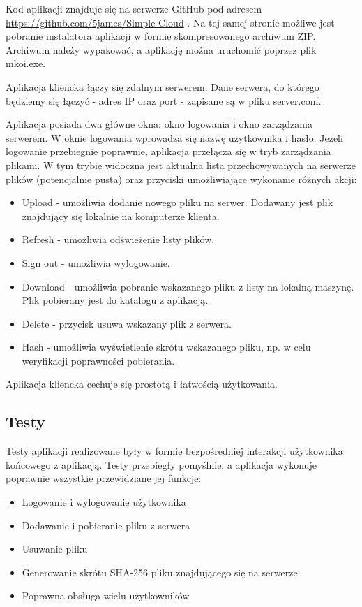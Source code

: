\documentclass{article}
\begin{document}
	Kod aplikacji znajduje się na serwerze GitHub pod adresem \url{https://github.com/5james/Simple-Cloud} . Na tej samej stronie możliwe jest pobranie instalatora aplikacji w formie skompresowanego archiwum ZIP. Archiwum należy wypakować, a aplikację można uruchomić poprzez plik mkoi.exe. 
	
	Aplikacja kliencka łączy się zdalnym serwerem. Dane serwera, do którego będziemy się łączyć - adres IP oraz port - zapisane są w pliku server.conf. 
	
	Aplikacja posiada dwa główne okna: okno logowania i okno zarządzania serwerem. W oknie logowania wprowadza się nazwę użytkownika i hasło. Jeżeli logowanie przebiegnie poprawnie, aplikacja przełącza się w tryb zarządzania plikami. W tym trybie widoczna jest aktualna lista przechowywanych na serwerze plików (potencjalnie pusta) oraz przyciski umożliwiające wykonanie różnych akcji:
	\begin{itemize}
		\item Upload - umożliwia dodanie nowego pliku na serwer. Dodawany jest plik znajdujący się lokalnie na komputerze klienta. 
		\item Refresh - umożliwia odświeżenie listy plików. 
		\item Sign out - umożliwia wylogowanie. 
		\item Download - umożliwia pobranie wskazanego pliku z listy na lokalną maszynę. Plik pobierany jest do katalogu z aplikacją. 
		\item Delete - przycisk usuwa wskazany plik z serwera. 
		\item Hash - umożliwia wyświetlenie skrótu wskazanego pliku, np. w celu weryfikacji poprawności pobierania. 
	\end{itemize}
	
	Aplikacja kliencka cechuje się prostotą i łatwością użytkowania. 
	
	\subsection{Testy}
	Testy aplikacji realizowane były w formie bezpośredniej interakcji użytkownika końcowego z aplikacją. Testy przebiegły pomyślnie, a aplikacja wykonuje poprawnie wszystkie przewidziane jej funkcje:
	\begin{itemize}
		\item Logowanie i wylogowanie użytkownika
		\item Dodawanie i pobieranie pliku z serwera
		\item Usuwanie pliku
		\item Generowanie skrótu SHA-256 pliku znajdującego się na serwerze
		\item Poprawna obsługa wielu użytkowników
	\end{itemize}
\end{document}
